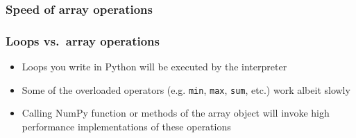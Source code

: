 \documentclass[12pt,letterpaper,twoside]{article}
\begin{document}
\begin{python}
\begin{Highlighting}[]
\end{Highlighting}
\end{python}

\begin{python}
\begin{Highlighting}[]
\end{Highlighting}
\end{python}

\hypertarget{speed-of-array-operations}{%
\subsubsection{Speed of array
operations}\label{speed-of-array-operations}}

\begin{python}
\begin{Highlighting}[]
\OperatorTok{%
\end{Highlighting}
\end{python}

\begin{python}
\begin{Highlighting}[]
\OperatorTok{%
\end{Highlighting}
\end{python}

\hypertarget{loops-vs.array-operations}{%
\subsubsection{Loops vs.~array
operations}\label{loops-vs.array-operations}}

\begin{itemize}
\item
  Loops you write in Python will be executed by the interpreter
\item
  Some of the overloaded operators (e.g. \texttt{min}, \texttt{max},
  \texttt{sum}, etc.) work albeit slowly
\item
  Calling NumPy function or methods of the array object will invoke high
  performance implementations of these operations
\end{itemize}
\end{document}
